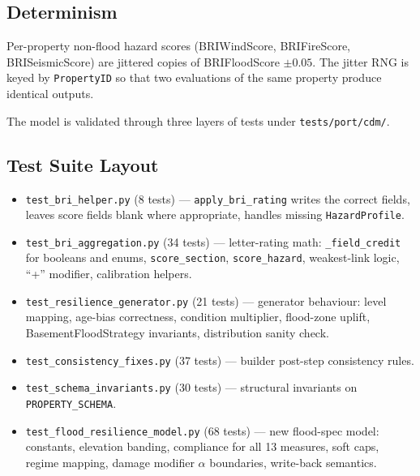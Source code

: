 \documentclass[11pt,a4paper]{article}
\begin{document}
\subsection{Determinism}
Per-property non-flood hazard scores (BRIWindScore, BRIFireScore, BRISeismicScore)
are jittered copies of BRIFloodScore $\pm 0.05$. The jitter RNG is keyed by
\texttt{PropertyID} so that two evaluations of the same property produce identical
outputs.

\mkmvalidation

The model is validated through three layers of tests under \texttt{tests/port/cdm/}.

\subsection{Test Suite Layout}
\begin{itemize}[nosep]
    \item \texttt{test\_bri\_helper.py} (8 tests) --- \texttt{apply\_bri\_rating}
          writes the correct fields, leaves score fields blank where appropriate,
          handles missing \texttt{HazardProfile}.
    \item \texttt{test\_bri\_aggregation.py} (34 tests) --- letter-rating math:
          \texttt{\_field\_credit} for booleans and enums, \texttt{score\_section},
          \texttt{score\_hazard}, weakest-link logic, ``+'' modifier, calibration helpers.
    \item \texttt{test\_resilience\_generator.py} (21 tests) --- generator behaviour:
          level mapping, age-bias correctness, condition multiplier, flood-zone uplift,
          BasementFloodStrategy invariants, distribution sanity check.
    \item \texttt{test\_consistency\_fixes.py} (37 tests) --- builder post-step
          consistency rules.
    \item \texttt{test\_schema\_invariants.py} (30 tests) --- structural invariants
          on \texttt{PROPERTY\_SCHEMA}.
    \item \texttt{test\_flood\_resilience\_model.py} (68 tests) --- new flood-spec
          model: constants, elevation banding, compliance for all 13 measures, soft
          caps, regime mapping, damage modifier $\alpha$ boundaries, write-back
          semantics.
\end{itemize}
\end{document}
